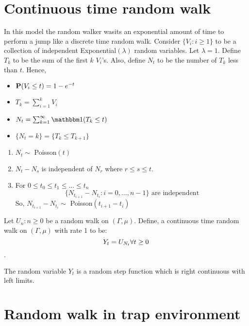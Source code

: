 \documentclass[main]{subfiles}
\begin{document}


\section{Continuous time random walk}
In this model the random walker wasits an exponential amount of time to perform a jump like a discrete time random walk. Consider $\{V_i : i\geq 1\}$ to be a collection of independent Exponential$(\lambda)$ random variables. Let $\lambda=1$. Define $T_k$ to be the sum of the first $k$ $V_i$'s. Also, define $N_t$ to be the number of $T_k$ less than $t$. Hence,
\begin{itemize}
    \item $\P(V_i \leq t)=1-e^{-t}$
    \item $T_k=\sum_{i=1}^{k}V_i$
    \item $N_t=\sum_{k=1}^{\infty}\one(T_k\leq t)$
    \item $\{N_t=k\}=\{T_k\leq T_{k+1}\}$
\end{itemize}
\begin{theorem}
    \begin{enumerate}
        \item $N_t\sim$ Poisson$(t)$
        \item $N_t-N_s$ is independent of $N_r$ where $r\leq s \leq t$.
        \item For $0\leq t_0 \leq t_1 \leq \ldots \leq t_n$
              $$
                  \{N_{t_{i+1}}-N_{t_i}: i=0,\ldots, n-1\} \text{ are independent}
              $$
              So, $N_{t_{i+1}}-N_{t_i}\sim$ Poisson$(t_{i+1}-t_i)$
    \end{enumerate}
\end{theorem}
\begin{definition}
    Let $U_n: n\geq 0$ be a random walk on $(\Gamma,\mu)$. Define, a continuous time random walk on $(\Gamma,\mu)$ with rate 1 to be:
    $$Y_t=U_{N_t} \hfill \forall t\geq 0$$.
\end{definition}
\begin{remark}
    The random variable $Y_t$ is a random step function which is right continuous with left limits.
\end{remark}

\section{Random walk in trap environment}
\end{document}
